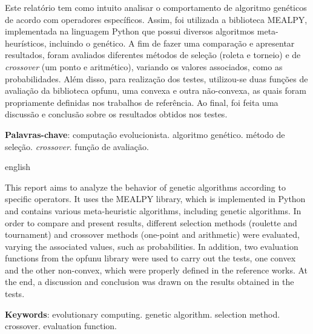 \begin{resumoumacoluna}
    Este relatório tem como intuito analisar o comportamento de algoritmo genéticos de acordo com operadores específicos. Assim, foi utilizada a biblioteca MEALPY, implementada na linguagem Python que possui diversos algoritmos meta-heurísticos, incluindo o genético. A fim de fazer uma comparação e apresentar resultados, foram avaliados diferentes métodos de seleção (roleta e torneio) e de \textit{crossover} (um ponto e aritmético), variando os valores associados, como as probabilidades. Além disso, para realização dos testes, utilizou-se duas funções de avaliação da biblioteca opfunu, uma convexa e outra não-convexa, as quais foram propriamente definidas nos trabalhos de referência. Ao final, foi feita uma discussão e conclusão sobre os resultados obtidos nos testes.

    \noindent
    \textbf{Palavras-chave}: computação evolucionista. algoritmo genético. método de seleção. \textit{crossover}. função de avaliação.
\end{resumoumacoluna}

\renewcommand{\resumoname}{Abstract}
\begin{resumoumacoluna}
    \begin{otherlanguage*}{english}

        This report aims to analyze the behavior of genetic algorithms according to specific operators. It uses the MEALPY library, which is implemented in Python and contains various meta-heuristic algorithms, including genetic algorithms. In order to compare and present results, different selection methods (roulette and tournament) and crossover methods (one-point and arithmetic) were evaluated, varying the associated values, such as probabilities. In addition, two evaluation functions from the opfunu library were used to carry out the tests, one convex and the other non-convex, which were properly defined in the reference works. At the end, a discussion and conclusion was drawn on the results obtained in the tests.

        \vspace{\onelineskip}

        \noindent
        \textbf{Keywords}: evolutionary computing. genetic algorithm. selection method. crossover. evaluation function.
    \end{otherlanguage*}
\end{resumoumacoluna}
